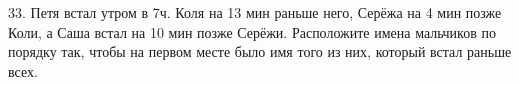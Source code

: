 33. Петя встал утром в 7ч. Коля на 13 мин раньше него, Серёжа на 4 мин позже Коли, а Саша встал на 10 мин позже Серёжи. Расположите имена мальчиков по порядку так, чтобы на первом месте было имя того из них, который встал раньше всех.\\
